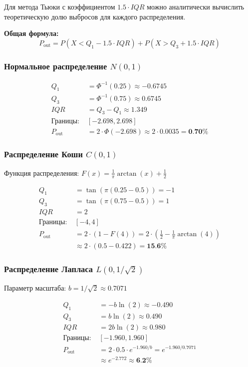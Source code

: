 \documentclass[a4paper,14pt]{extarticle}
\begin{document}
Для метода Тьюки с коэффициентом $1.5 \cdot IQR$ можно аналитически вычислить теоретическую долю выбросов для каждого распределения.

\textbf{Общая формула:}
\begin{equation}
P_{\text{out}} = P(X < Q_1 - 1.5 \cdot IQR) + P(X > Q_3 + 1.5 \cdot IQR)
\end{equation}

\subsubsection*{Нормальное распределение $N(0, 1)$}

\begin{align*}
Q_1 &= \Phi^{-1}(0.25) \approx -0.6745 \\
Q_3 &= \Phi^{-1}(0.75) \approx 0.6745 \\
IQR &= Q_3 - Q_1 \approx 1.349 \\
\text{Границы: } & [-2.698, 2.698] \\
P_{\text{out}} &= 2 \cdot \Phi(-2.698) \approx 2 \cdot 0.0035 = \textbf{0.70\%}
\end{align*}

\subsubsection*{Распределение Коши $C(0, 1)$}

Функция распределения: $F(x) = \frac{1}{\pi}\arctan(x) + \frac{1}{2}$

\begin{align*}
Q_1 &= \tan\left(\pi(0.25 - 0.5)\right) = -1 \\
Q_3 &= \tan\left(\pi(0.75 - 0.5)\right) = 1 \\
IQR &= 2 \\
\text{Границы: } & [-4, 4] \\
P_{\text{out}} &= 2 \cdot \left(1 - F(4)\right) = 2 \cdot \left(\frac{1}{2} - \frac{1}{\pi}\arctan(4)\right) \\
&\approx 2 \cdot (0.5 - 0.422) = \textbf{15.6\%}
\end{align*}

\subsubsection*{Распределение Лапласа $L(0, 1/\sqrt{2})$}

Параметр масштаба: $b = 1/\sqrt{2} \approx 0.7071$

\begin{align*}
Q_1 &= -b \ln(2) \approx -0.490 \\
Q_3 &= b \ln(2) \approx 0.490 \\
IQR &= 2b \ln(2) \approx 0.980 \\
\text{Границы: } & [-1.960, 1.960] \\
P_{\text{out}} &= 2 \cdot 0.5 \cdot e^{-1.960/b} = e^{-1.960/0.7071} \\
&\approx e^{-2.772} \approx \textbf{6.2\%}
\end{align*}
\end{document}
